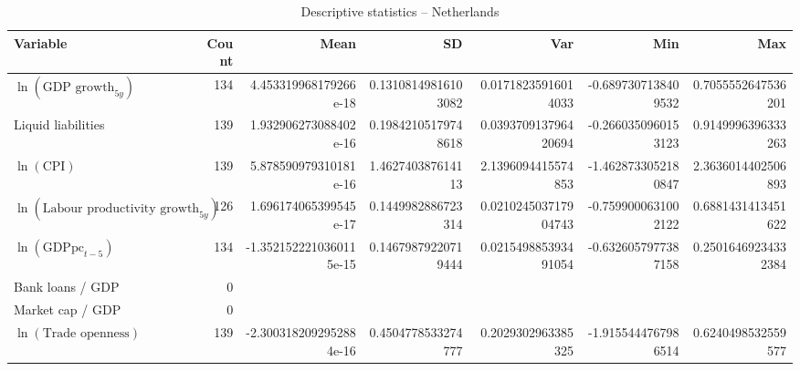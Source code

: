 \begin{table}[!htbp]
\centering
\caption{Descriptive statistics -- Netherlands}
\footnotesize
\begin{tabular}{lrrrrrr}
\toprule
Variable & Count & Mean & SD & Var & Min & Max \\
\midrule
$\ln(\text{GDP growth}_{5y})$ & 134 & 4.453319968179266e-18 & 0.13108149816103082 & 0.01718235916014033 & -0.6897307138409532 & 0.7055552647536201 \\
Liquid liabilities & 139 & 1.932906273088402e-16 & 0.19842105179748618 & 0.039370913796420694 & -0.2660350960153123 & 0.9149996396333263 \\
$\ln(\text{CPI})$ & 139 & 5.878590979310181e-16 & 1.462740387614113 & 2.1396094415574853 & -1.4628733052180847 & 2.3636014402506893 \\
$\ln(\text{Labour productivity growth}_{5y})$ & 126 & 1.696174065399545e-17 & 0.1449982886723314 & 0.021024503717904743 & -0.7599000631002122 & 0.6881431413451622 \\
$\ln(\text{GDPpc}_{t-5})$ & 134 & -1.3521522210360115e-15 & 0.14679879220719444 & 0.021549885393491054 & -0.6326057977387158 & 0.25016469234332384 \\
Bank loans / GDP & 0 &  &  &  &  &  \\
Market cap / GDP & 0 &  &  &  &  &  \\
$\ln(\text{Trade openness})$ & 139 & -2.3003182092952884e-16 & 0.4504778533274777 & 0.2029302963385325 & -1.9155444767986514 & 0.6240498532559577 \\
\bottomrule
\end{tabular}
\end{table}


